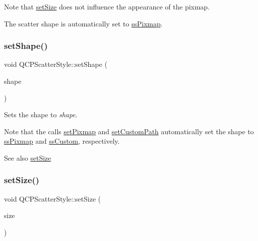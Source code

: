 Note that \hyperlink{classQCPScatterStyle_aaefdd031052892c4136129db68596e0f}{set\+Size} does not influence the appearance of the pixmap.

The scatter shape is automatically set to \hyperlink{classQCPScatterStyle_adb31525af6b680e6f1b7472e43859349a8718b849ca7c307b07b8e091efb0c31e}{ss\+Pixmap}. \mbox{\label{classQCPScatterStyle_a7c641c4d4c6d29cb705d3887cfce91c1}} 
\subsubsection{\texorpdfstring{set\+Shape()}{setShape()}}
{\footnotesize\ttfamily void Q\+C\+P\+Scatter\+Style\+::set\+Shape (\begin{DoxyParamCaption}\item[{\hyperlink{classQCPScatterStyle_adb31525af6b680e6f1b7472e43859349}{Q\+C\+P\+Scatter\+Style\+::\+Scatter\+Shape}}]{shape }\end{DoxyParamCaption})}

Sets the shape to {\itshape shape}.

Note that the calls \hyperlink{classQCPScatterStyle_a5fb611d46acfac520d7b89a1c71d9246}{set\+Pixmap} and \hyperlink{classQCPScatterStyle_a96a3e949f90b2afe5677ca9412a12a1e}{set\+Custom\+Path} automatically set the shape to \hyperlink{classQCPScatterStyle_adb31525af6b680e6f1b7472e43859349a8718b849ca7c307b07b8e091efb0c31e}{ss\+Pixmap} and \hyperlink{classQCPScatterStyle_adb31525af6b680e6f1b7472e43859349a15d9bcfd9de94edda949006529f9219d}{ss\+Custom}, respectively.

\begin{DoxySeeAlso}{See also}
\hyperlink{classQCPScatterStyle_aaefdd031052892c4136129db68596e0f}{set\+Size} 
\end{DoxySeeAlso}
\mbox{\label{classQCPScatterStyle_aaefdd031052892c4136129db68596e0f}} 
\subsubsection{\texorpdfstring{set\+Size()}{setSize()}}
{\footnotesize\ttfamily void Q\+C\+P\+Scatter\+Style\+::set\+Size (\begin{DoxyParamCaption}\item[{double}]{size }\end{DoxyParamCaption})}

